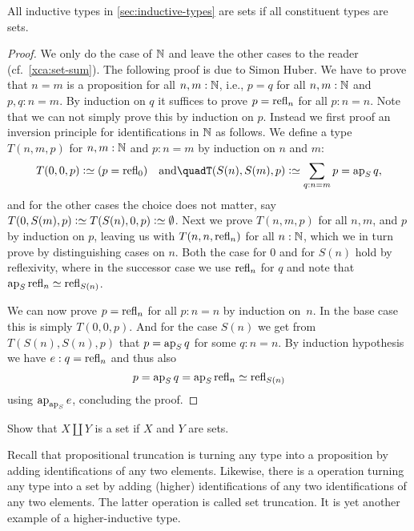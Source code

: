 \begin{theorem}\label{thm:isset-inductive-types}
All inductive types in \cref{sec:inductive-types} are sets
if all constituent types are sets.
\end{theorem}

\begin{proof}
  We only do the case of $\mathbb{N}$ and leave the other cases to the reader
  (cf.\ \cref{xca:set-sum}). The following proof is due to Simon Huber.
  We have to prove that $n=m$ is a
  proposition for all $n,m:\mathbb{N}$, i.e., $p = q$ for all $n,m : \mathbb{N}$ and
  $p, q : n = m$.  By induction on $q$ it suffices to prove $p = \refl
  n$ for all $p : n = n$.  Note that we can not simply prove this by
  induction on $p$.  Instead we first proof an inversion principle for
  identifications in $\mathbb{N}$ as follows.  We define a type $T(n,m,p)$
  for $n, m : \mathbb{N}$ and $p : n = m$ by induction on $n$ and $m$:
  \[
    T(0,0,p) \defeq (p = \refl{0})%
    \quad \text{and} \quad%
    T(S(n), S(m), p) \defeq \sum_{q : n = m} p = \ap S q,%
  \]
  and for the other cases the choice does not matter, say $T(0, S(m),
  p) \defeq T(S(n), 0 ,p) \defeq \emptytype$.  Next we prove $T(n,m,p)$
  for all $n,m$, and $p$ by induction on $p$, leaving us with
  $T(n,n,\refl{n})$ for all $n : \mathbb{N}$, which we in turn prove by
  distinguishing cases on $n$.  Both the case for $0$ and for $S(n)$
  hold by reflexivity, where in the successor case we use $\refl{n}$
  for $q$ and note that $\ap S \refl{n} \jdeq \refl{S(n)}$.

  We can now prove $p = \refl{n}$ for all $p : n = n$ by induction
  on~$n$.  In the base case this is simply $T(0,0,p)$.  And for the
  case $S(n)$ we get from $T(S(n),S(n),p)$ that $p = \ap{S} q$ for
  some $q : n = n$.  By induction hypothesis we have $e : q =
  \refl{n}$ and thus also
  \[
    p = \ap{S} q = \ap{S} \refl{n} \jdeq \refl{S (n)}
  \]
  using $\ap{\ap{S}} e$, concluding the proof.
\end{proof}

\begin{xca}\label{xca:set-sum}
Show that $X\amalg Y$ is a set if $X$ and $Y$ are sets.
\end{xca}

Recall that propositional truncation is turning any type into
a proposition by adding identifications of any two elements.
Likewise, there is a operation turning any type into a set
by adding (higher) identifications of any two identifications
of any two elements. The latter operation is called set truncation.
It is yet another example of a higher-inductive type.

